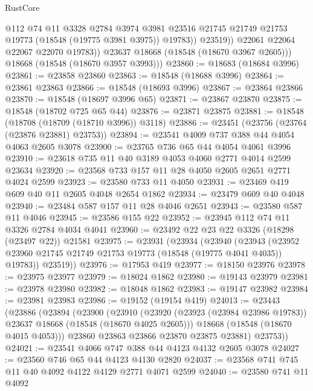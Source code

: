 \begin{lexlean}{RustCore}
\begin{coremodule}
                    @112
                    @74
                    @11
                    @3328
                    @2784
                    @3974
                    @3981
                    @23516
                    @21745
                    @21749
                    @21753
                    @19773
                    (@18548 (@19775 @3981 @3975))
                    @19783))
                @23519))
            @22061
            @22064
            @22067
            @22070
            @19783))
        @23637
        @18668
        (@18548 (@18670 @3967 @2605)))
      @18668
      (@18548 (@18670 @3957 @3993)))
@23860 := @18683 (@18684 @3996)
@23861 := @23858 @23860
@23863 := @18548 (@18688 @3996)
@23864 := @23861 @23863
@23866 := @18548 (@18693 @3996)
@23867 := @23864 @23866
@23870 := @18548 (@18697 @3996 @65)
@23871 := @23867 @23870
@23875 := @18548 (@18702 @725 @65 @44)
@23876 := @23871 @23875
@23881 := @18548 (@18708 (@18709 (@18710 @3996)) @3118)
@23886 := @23451 (@23756 (@23764 (@23876 @23881) @23753))
@23894 := @23541 @4009 @737 @388 @44 @4054 @4063 @2605 @3078
@23900 := @23765 @736 @65 @44 @4054 @4061 @3996
@23910 := @23618 @735 @11 @40 @3189 @4053 @4060 @2771 @4014 @2599 @23634
@23920 := @23568 @733 @157 @11 @28 @4050 @2605 @2651 @2771 @4024 @2599
@23923 := @23580 @733 @11 @4050
@23931 := @23469 @419 @609 @40 @11 @2605 @4048 @2654 @1862
@23934 := @23479 @609 @40 @4048
@23940 := @23484 @587 @157 @11 @28 @4046 @2651
@23943 := @23580 @587 @11 @4046
@23945 := @23586 @155 @22
@23952 := @23945 @112 @74 @11 @3326 @2784 @4034 @4041
@23960 := @23492 @22 @23 @22 @3326 (@18298 (@23497 @22)) @21581
@23975 := @23931
    (@23934
      (@23940
        (@23943 (@23952 @23960 @21745 @21749 @21753 @19773 (@18548 (@19775 @4041 @4035)) @19783))
        @23519))
@23976 := @17953 @419
@23977 := @18150 @23976
@23978 := @23975 @23977
@23979 := @18024 @1862
@23980 := @19143 @23979
@23981 := @23978 @23980
@23982 := @18048 @1862
@23983 := @19147 @23982
@23984 := @23981 @23983
@23986 := @19152 (@19154 @419)
@24013 := @23443
    (@23886
      (@23894
        (@23900
          (@23910
            (@23920 (@23923 (@23984 @23986 @19783)) @23637 @18668 (@18548 (@18670 @4025 @2605)))
            @18668
            (@18548 (@18670 @4015 @4053)))
          @23860
          @23863
          @23866
          @23870
          @23875
          @23881)
        @23753))
@24021 := @23541 @4066 @747 @388 @44 @4123 @4132 @2605 @3078
@24027 := @23560 @746 @65 @44 @4123 @4130 @2820
@24037 := @23568 @741 @745 @11 @40 @4092 @4122 @4129 @2771 @4071 @2599
@24040 := @23580 @741 @11 @4092

\end{coremodule}
\end{lexlean}
